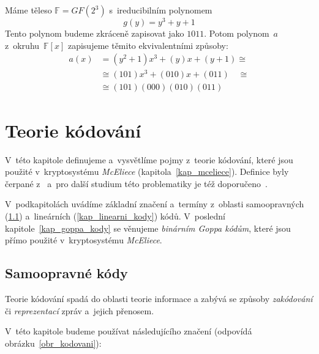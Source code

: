 \documentclass[thesis=M,czech,hidelinks]{FITthesis}[2012/06/26]
\newcommand{\0}{{\textcolor[gray]{0.75}{0}}}
\begin{document}
Máme těleso $\mathbb{F} = GF(2^3)$ s~ireducibilním polynomem
$$  g(y) = y^3 + y + 1$$
Tento polynom budeme zkráceně zapisovat jako $1011$. Potom polynom~$a$
z~okru\-hu~$\mathbb{F}[x]$ zapisujeme těmito ekvivalentními způsoby:
\begin{align*}
    a(x) &= (y^2 + 1)x^3 + (y)x + (y+1)         \cong \\
         &\cong (101)x^3 + (010)x + (011) \quad \cong \\
         &\cong (101)(000)(010)(011)
\end{align*}





\chapter{Teorie kódování}\label{kap_kody}

V~této kapitole definujeme a~vysvětlíme pojmy z~teorie kódování, které jsou
použité v~kryptosystému \emph{McEliece} (kapitola~\ref{kap_mceliece}). Definice
byly čerpané z~\cite{FIT_AAK,Adamek} a~pro další studium této problematiky je
též doporučeno~\cite{McEliece_coding}.

V~podkapitolách uvádíme základní značení a~termíny z~oblasti samoopravných
(\ref{kap_samoopravne_kody}) a~lineárních (\ref{kap_linearni_kody}) kódů.
V~poslední kapitole~\ref{kap_goppa_kody} se věnujeme \emph{binárním Goppa
kódům}, které jsou přímo použité v~kryptosystému \emph{McEliece}.

\section{Samoopravné kódy}\label{kap_samoopravne_kody}

Teorie kódování spadá do oblasti teorie informace a zabývá se způsoby
\emph{zakódování} či \emph{reprezentací} zpráv a~jejich přenosem.

V~této kapitole budeme používat následujícího značení (odpovídá
obrázku~\ref{obr_kodovani}):
\end{document}
